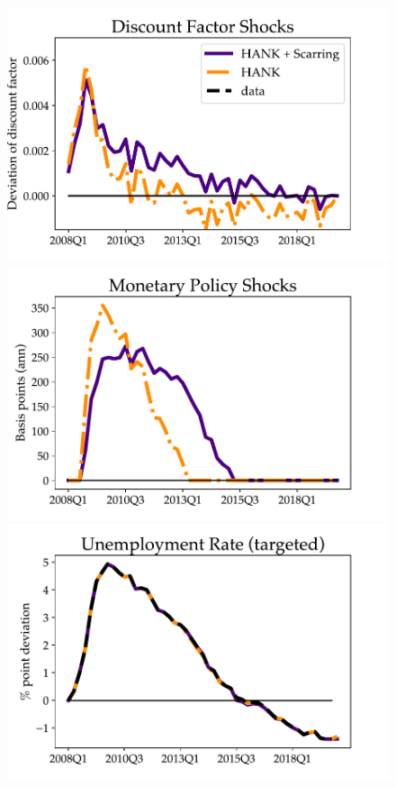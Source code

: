 \begin{figure}[H]
\begin{center}
\begin{minipage}{0.5\textwidth}
\includegraphics[scale=.5]{text/chapter1/Figures/GR_sim/DiscFacShks}
\end{minipage}\hspace*{\fill}
\begin{minipage}{0.5\textwidth}
\includegraphics[scale=.5]{text/chapter1/Figures/GR_sim/EVShocks}
\end{minipage}
\medskip
\begin{minipage}{0.5\textwidth}
\includegraphics[scale=.5]{text/chapter1/Figures/GR_sim/Urate_}

\end{minipage}
\end{center}
\end{figure}
